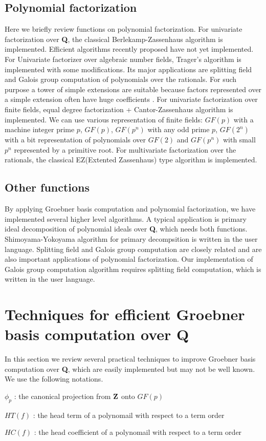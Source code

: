 \documentclass[runningheads]{cl2emult}
\begin{document}
\subsection{Polynomial factorization}

Here we briefly review functions on polynomial factorization.  For
univariate factorization over {\bf Q}, the classical
Berlekamp-Zassenhaus algorithm is implemented.  Efficient algorithms
recently proposed have not yet implemented.  For Univariate factorizer
over algebraic number fields, Trager's algorithm \cite{TRAGER} is
implemented with some modifications.  Its major applications are
splitting field and Galois group computation of polynomials over the
rationals. For such purpose a tower of simple extensions are suitable
because factors represented over a simple extension often have huge
coefficients \cite{ANY}.  For univariate factorization over finite
fields, equal degree factorization + Cantor-Zassenhaus algorithm is
implemented. We can use various representation of finite fields:
$GF(p)$ with a machine integer prime $p$, $GF(p)$, $GF(p^n)$ with any
odd prime $p$, $GF(2^n)$ with a bit representation of polynomials over
$GF(2)$ and $GF(p^n)$ with small $p^n$ represented by a primitive
root.  For multivariate factorization over the rationals, the
classical EZ(Extented Zassenhaus) type algorithm is implemented.

\subsection{Other functions}
By applying Groebner basis computation and polynomial factorization,
we have implemented several higher level algorithms. A typical
application is primary ideal decomposition of polynomial ideals over
{\bf Q}, which needs both functions.  Shimoyama-Yokoyama algorithm
\cite{SY} for primary decompsition is written in the user language.
Splitting field and Galois group computation are closely related and
are also important applications of polynomial factorization.  Our
implementation of Galois group computation algorithm \cite{ANY}
requires splitting field computation, which is written in the
user language.

\section{Techniques for efficient Groebner basis computation over {\bf Q}}
\label{gbtech}

In this section we review several practical techniques to improve
Groebner basis computation over {\bf Q}, which are easily
implemented but may not be well known.
We use the following notations.
\begin{description}
\item $\phi_p$ : the canonical projection from ${\bf Z}$ onto $GF(p)$
\item $HT(f)$ : the head term of a polynomail with respect to a term order
\item $HC(f)$ : the head coefficient of a polynomail with respect to a term order
\end{description}
\end{document}
